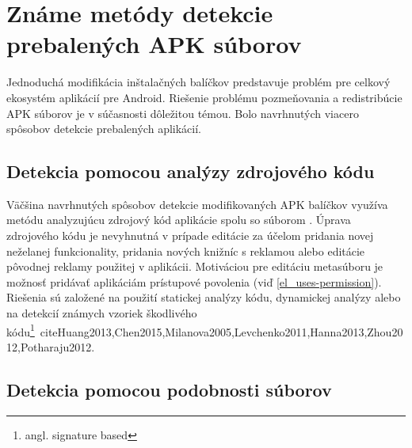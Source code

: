 \section{Známe metódy detekcie prebalených APK súborov}

Jednoduchá modifikácia inštalačných balíčkov predstavuje problém pre celkový ekosystém aplikácií pre Android. Riešenie problému pozmeňovania a redistribúcie APK súborov je v súčasnosti dôležitou témou. Bolo navrhnutých viacero spôsobov detekcie prebalených aplikácií. 

\subsection{Detekcia pomocou analýzy zdrojového kódu}
Väčšina navrhnutých spôsobov detekcie modifikovaných APK balíčkov využíva metódu analyzujúcu zdrojový kód aplikácie spolu so súborom . Úprava zdrojového kódu je nevyhnutná v prípade editácie za účelom pridania novej neželanej funkcionality, pridania nových knižníc s reklamou alebo editácie pôvodnej reklamy použitej v aplikácii. Motiváciou pre editáciu metasúboru  je možnosť pridávať aplikáciám prístupové povolenia (viď \ref{el_uses-permission}).
Riešenia sú založené na použití statickej analýzy kódu, dynamickej analýzy alebo na detekcií známych vzoriek škodlivého kódu\footnote{angl. signature based}~cite{Huang2013,Chen2015,Milanova2005,Levchenko2011,Hanna2013,Zhou2012,Potharaju2012}.
	
\subsection{Detekcia pomocou podobnosti súborov}

